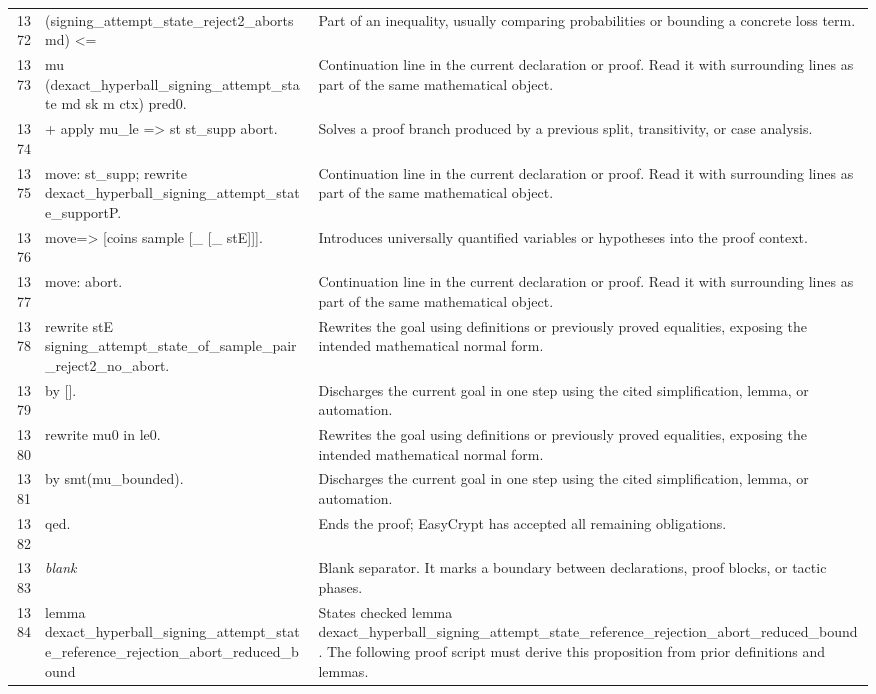 \documentclass[10pt]{article}
\begin{document}
\begin{longtable}{r L{0.53\textwidth} L{0.37\textwidth}}
1372 & {\ttfamily\scriptsize     (signing\_attempt\_state\_reject2\_aborts md) <=} & Part of an inequality, usually comparing probabilities or bounding a concrete loss term. \\
1373 & {\ttfamily\scriptsize   mu (dexact\_hyperball\_signing\_attempt\_state md sk m ctx) pred0.} & Continuation line in the current declaration or proof.  Read it with surrounding lines as part of the same mathematical object. \\
1374 & {\ttfamily\scriptsize + apply mu\_le => st st\_supp abort.} & Solves a proof branch produced by a previous split, transitivity, or case analysis. \\
1375 & {\ttfamily\scriptsize   move: st\_supp; rewrite dexact\_hyperball\_signing\_attempt\_state\_supportP.} & Continuation line in the current declaration or proof.  Read it with surrounding lines as part of the same mathematical object. \\
1376 & {\ttfamily\scriptsize   move=> [coins sample [\_ [\_ stE]]].} & Introduces universally quantified variables or hypotheses into the proof context. \\
1377 & {\ttfamily\scriptsize   move: abort.} & Continuation line in the current declaration or proof.  Read it with surrounding lines as part of the same mathematical object. \\
1378 & {\ttfamily\scriptsize   rewrite stE signing\_attempt\_state\_of\_sample\_pair\_reject2\_no\_abort.} & Rewrites the goal using definitions or previously proved equalities, exposing the intended mathematical normal form. \\
1379 & {\ttfamily\scriptsize   by [].} & Discharges the current goal in one step using the cited simplification, lemma, or automation. \\
1380 & {\ttfamily\scriptsize rewrite mu0 in le0.} & Rewrites the goal using definitions or previously proved equalities, exposing the intended mathematical normal form. \\
1381 & {\ttfamily\scriptsize by smt(mu\_bounded).} & Discharges the current goal in one step using the cited simplification, lemma, or automation. \\
1382 & {\ttfamily\scriptsize qed.} & Ends the proof; EasyCrypt has accepted all remaining obligations. \\
1383 & {\ttfamily\scriptsize \emph{blank}} & Blank separator.  It marks a boundary between declarations, proof blocks, or tactic phases. \\
1384 & {\ttfamily\scriptsize lemma dexact\_hyperball\_signing\_attempt\_state\_reference\_rejection\_abort\_reduced\_bound} & States checked lemma dexact\_hyperball\_signing\_attempt\_state\_reference\_rejection\_abort\_reduced\_bound.  The following proof script must derive this proposition from prior definitions and lemmas. \\

\end{longtable}
\end{document}

